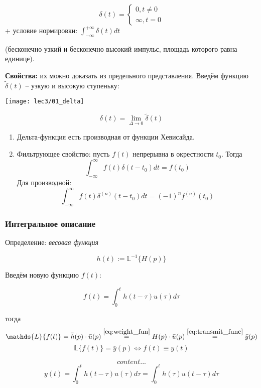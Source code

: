 \documentclass[main.tex]{subfiles}
\begin{document}
$$ \delta(t) = \begin{cases}
	0, t \ne 0 \\
	\infty, t = 0
 \end{cases} $$
+ условие нормировки: $ \int_{- \infty}^{+ \infty} \delta(t) dt $

(бесконечно узкий и бесконечно высокий импульс, площадь которого равна единице).

\textbf{Свойства:}
их можно доказать из предельного представления.
Введём функцию $ \tilde \delta (t) $ -- узкую и высокую ступеньку:

\texttt{[image: lec3/01\_delta]}

\[ \delta(t) = \lim_{\Delta \to 0} \tilde \delta(t) \]


\begin{enumerate}[noitemsep]
	\item Дельта-функция есть производная от функции Хевисайда.
	\item Фильтрующее свойство:
    пусть $ f(t) $ непрерывна в окрестности $ t_0 $.
    Тогда
    \[ \int_{-\infty}^{\infty} f(t) \delta(t-t_0) dt = f(t_0)  \]
    Для производной:
    \[ \int_{-\infty}^{\infty} f(t) \delta^{(n)}(t-t_0) dt = (-1)^n f^{(n)}(t_0) \]
\end{enumerate}

\subsubsection{ Интегральное описание }

Определение: \emph{ весовая функция }

\begin{equation} \label{eq:weight_fun}
    h(t) := \mathds{L}^{-1}\{ H(p) \}
\end{equation}

Введём новую функцию $ f(t) $:

$$ f(t) = \int_0^t h(t - \tau) u(\tau) d \tau $$

тогда
\[ \mathds{L}\{ f(t) \} = \bar h(p) \cdot \bar u(p) \overset{\eqref{eq:weight_fun}}= H(p) \cdot \bar u(p) \overset{\eqref{eq:transmit_func}}= \bar y(p) \]
\[ \mathds{L}\{ f(t) \} = \bar y(p) \Leftrightarrow f(t) \equiv y(t) \]

\begin{equation}\label{eq:third_form}
    content...
\end{equation}
$$ y(t) = \int_{0}^{t}h(t - \tau)u(\tau) d\tau = \int_{0}^{t}h(\tau)u(t - \tau) d\tau $$
\end{document}
